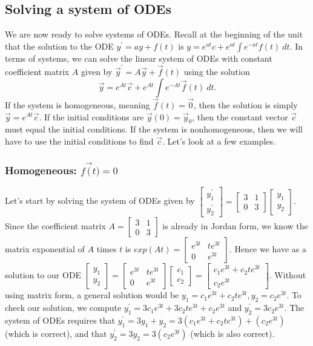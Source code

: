 \subsection{Solving a system of ODEs}
We are now ready to solve systems of ODEs.  Recall at the beginning of the unit that the solution to the ODE 
 $y^\prime =a y+f(t)$ is $y=e^{at}c+e^{at}\int e^{-at}f(t)\ dt.$ In terms of systems, we can solve the linear system of ODEs with constant coefficient matrix $A$ given by $\vec y^\prime =A \vec y+\vec f(t)$ using the solution
$$\vec y=e^{At}\vec c+e^{At}\int e^{-At}\vec f(t)\ dt.$$ If the system is homogeneous, meaning $\vec f(t)=\vec 0$, then the solution is simply $\vec y=e^{At}\vec c$. If the initial conditions are $\vec y(0)=\vec y_0$, then the constant vector $\vec c$ must equal the initial conditions. If the system is nonhomogeneous, then we will have to use the initial conditions to find $\vec c$. Let's look at a few examples.


\subsubsection{Homogeneous: $f\vec (t)=0$}
Let's start by solving the system of ODEs given by 
$
\begin{bmatrix}
y_1^\prime\\
y_2^\prime
\end{bmatrix}
=
\begin{bmatrix}
3&1\\
0&3
\end{bmatrix}
\begin{bmatrix}
y_1\\
y_2
\end{bmatrix}
$. Since the coefficient matrix $A = \begin{bmatrix}
3&1\\
0&3
\end{bmatrix}
$ is already in Jordan form, we know the matrix exponential of $A$ times $t$ is 
$exp(At) = 
\begin{bmatrix}
e^{3t}&te^{3t}\\
0&e^{3t}
\end{bmatrix}
$.  Hence we have as a solution to our ODE 
$
\begin{bmatrix}
y_1\\
y_2
\end{bmatrix}
=
\begin{bmatrix}
e^{3t}&te^{3t}\\
0&e^{3t}
\end{bmatrix}
\begin{bmatrix}
c_1\\
c_2
\end{bmatrix}
=
\begin{bmatrix}
c_1e^{3t}+c_2te^{3t}\\
c_2e^{3t}
\end{bmatrix}$. Without using matrix form, a general solution would be $y_1=c_1e^{3t}+c_2te^{3t}, y_2=c_2e^{3t}$.  To check our solution, we compute $y_1^\prime = 3c_1e^{3t}+3c_2te^{3t}+c_2e^{3t}$ and $y_2^\prime = 3c_2e^{3t}$.  The system of ODEs requires that $y_1^\prime = 3y_1+y_2 = 3(c_1e^{3t}+c_2te^{3t})+(c_2e^{3t})$ (which is correct), and that $y_2^\prime = 3y_2 = 3(c_2e^{3t})$ (which is also correct). 

